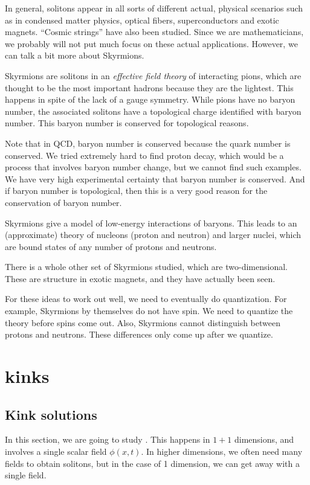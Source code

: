 \documentclass[a4paper]{article}
\begin{document}
In general, solitons appear in all sorts of different actual, physical scenarios such as in condensed matter physics, optical fibers, superconductors and exotic magnets. ``Cosmic strings'' have also been studied. Since we are mathematicians, we probably will not put much focus on these actual applications. However, we can talk a bit more about Skyrmions.

Skyrmions are solitons in an \emph{effective field theory} of interacting pions, which are thought to be the most important hadrons because they are the lightest. This happens in spite of the lack of a gauge symmetry. While pions have no baryon number, the associated solitons have a topological charge identified with baryon number. This baryon number is conserved for topological reasons.

Note that in QCD, baryon number is conserved because the quark number is conserved. We tried extremely hard to find proton decay, which would be a process that involves baryon number change, but we cannot find such examples. We have very high experimental certainty that baryon number is conserved. And if baryon number is topological, then this is a very good reason for the conservation of baryon number.

Skyrmions give a model of low-energy interactions of baryons. This leads to an (approximate) theory of nucleons (proton and neutron) and larger nuclei, which are bound states of any number of protons and neutrons.

There is a whole other set of Skyrmions studied, which are two-dimensional. These are structure in exotic magnets, and they have actually been seen.

For these ideas to work out well, we need to eventually do quantization. For example, Skyrmions by themselves do not have spin. We need to quantize the theory before spins come out. Also, Skyrmions cannot distinguish between protons and neutrons. These differences only come up after we quantize.

\section{ kinks}
\subsection{Kink solutions}
In this section, we are going to study . This happens in $1 + 1$ dimensions, and involves a single scalar field $\phi(x, t)$. In higher dimensions, we often need many fields to obtain solitons, but in the case of 1 dimension, we can get away with a single field.
\end{document}
